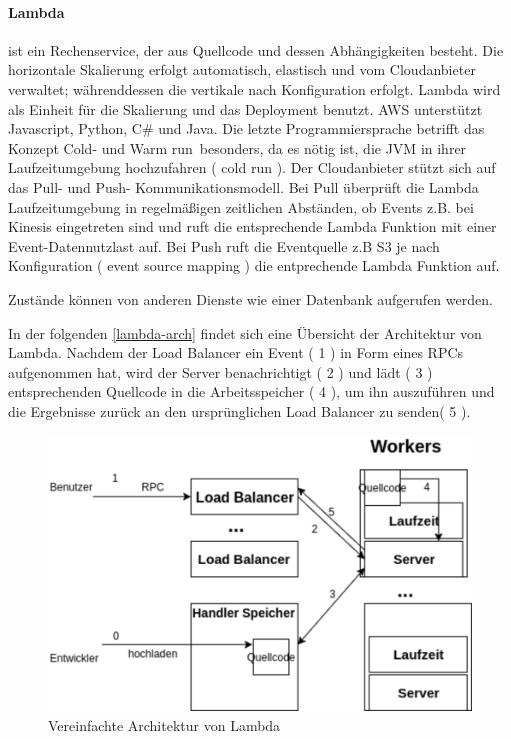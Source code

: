 \documentclass[
12pt,
english,
ngerman,
headsepline,
twoside,
openright,
numbers=noenddot,version=first
]{scrreprt}
\begin{document}
\paragraph{Lambda}\label{par:lambda} ist ein Rechenservice, der aus Quellcode und dessen Abhängigkeiten besteht. Die horizontale Skalierung erfolgt automatisch, elastisch und vom Cloudanbieter verwaltet; währenddessen die vertikale nach Konfiguration erfolgt. Lambda wird als Einheit für die Skalierung und das Deployment benutzt. \acrshort{AWS} unterstützt Javascript, Python, C\# und Java. Die letzte Programmiersprache betrifft das Konzept \glqq Cold- und Warm\label{lambda-cold-warm} run\grqq\ besonders, da es nötig ist, die \acrfull{JVM} in ihrer Laufzeitumgebung hochzufahren ( cold run ). Der Cloudanbieter stützt sich auf das Pull- und Push- Kommunikationsmodell. Bei Pull überprüft die Lambda Laufzeitumgebung in regelmäßigen zeitlichen Abständen, ob Events z.B. bei Kinesis eingetreten sind und ruft die entsprechende Lambda Funktion mit einer Event-Datennutzlast auf. Bei Push ruft die Eventquelle z.B S3 je nach Konfiguration ( event source mapping ) die entprechende Lambda Funktion auf. 

Zustände können von anderen Dienste wie einer Datenbank aufgerufen werden.


In der folgenden \autoref{lambda-arch} findet sich eine Übersicht der Architektur von Lambda. Nachdem der Load Balancer ein Event ( 1 ) in Form eines \acrfull{RPC}s aufgenommen hat, wird der Server benachrichtigt ( 2 ) und lädt ( 3 ) entsprechenden Quellcode in die Arbeitsspeicher ( 4 ), um ihn auszuführen und die Ergebnisse zurück an den ursprünglichen Load Balancer zu senden( 5 ). 

\begin{figure}[H]
	\centering{}
	\includegraphics[scale=0.60]{./pics/lambda-arch.eps}
	\caption{Vereinfachte Architektur von Lambda \cite{lambdaOpen}}
	\label{lambda-arch}
\end{figure}
\end{document}

